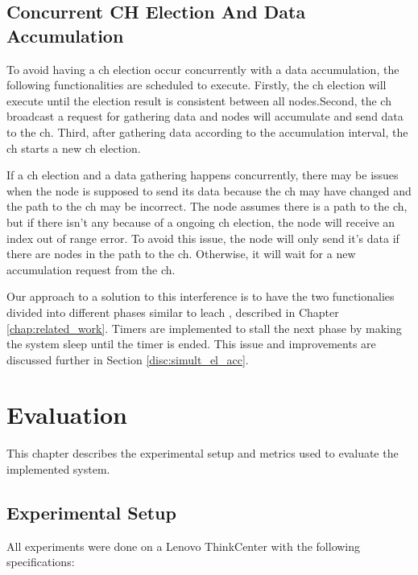 \documentclass[USenglish]{uit-thesis}
\begin{document}
\newpage

\section{Concurrent CH Election And Data Accumulation} \label{sec:conc_events}
To avoid having a \gls{ch} election occur concurrently with a data accumulation, the following functionalities are scheduled to execute.
Firstly, the \gls{ch} election will execute until the election result is consistent between all nodes.Second, the \gls{ch} broadcast a request for gathering data and nodes will accumulate and send data to the \gls{ch}. Third, after gathering data according to the accumulation interval, the \gls{ch} starts a new \gls{ch} election. 

If a \gls{ch} election and a data gathering happens concurrently, there may be issues when the node is supposed to send its data because the \gls{ch} may have changed and the path to the \gls{ch} may be incorrect. The node assumes there is a path to the \gls{ch}, but if there isn't any because of a ongoing \gls{ch} election, the node will receive an index out of range error. To avoid this issue, the node will only send it's data if there are nodes in the path to the \gls{ch}. Otherwise, it will wait for a new accumulation request from the \gls{ch}.

Our approach to a solution to this interference is to have the two functionalies divided into different phases similar to \gls{leach} \cite{leach}, described in Chapter \ref{chap:related_work}. Timers are implemented to stall the next phase by making the system sleep until the timer is ended. This issue and improvements are discussed further in Section \ref{disc:simult_el_acc}.







\chapter{Evaluation}
\glsresetall
This chapter describes the experimental setup and metrics used to evaluate the implemented system.

\section{Experimental Setup}
All experiments were done on a Lenovo ThinkCenter with the following specifications:
\end{document}
